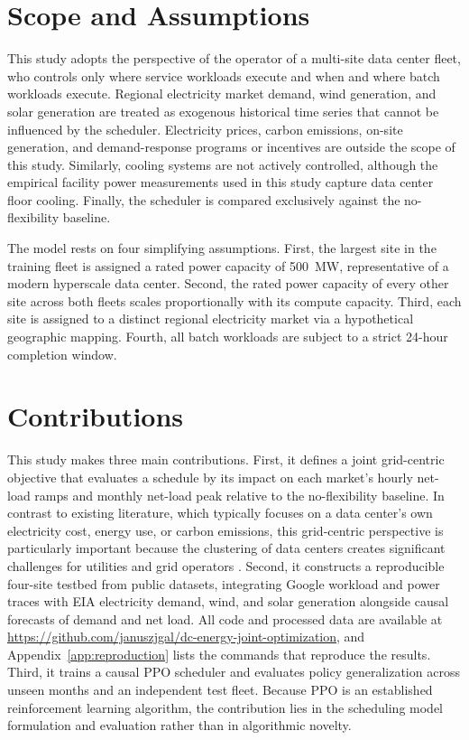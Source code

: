 \documentclass{UNCC-thesis}
\begin{document}
\section{Scope and Assumptions}
\label{sec:intro-scope}

This study adopts the perspective of the operator of a multi-site data center fleet, who controls
only where service workloads execute and when and where batch workloads execute. Regional
electricity market demand, wind generation, and solar generation are treated as exogenous
historical time series that cannot be influenced by the scheduler. Electricity prices, carbon
emissions, on-site generation, and demand-response programs or incentives are outside the scope of
this study. Similarly, cooling systems are not actively controlled, although the empirical
facility power measurements used in this study capture data center floor cooling. Finally, the
scheduler is compared exclusively against the no-flexibility baseline.

The model rests on four simplifying assumptions. First, the largest site in the training fleet is
assigned a rated power capacity of 500~MW, representative of a modern hyperscale data center.
Second, the rated power capacity of every other site across both fleets scales proportionally with
its compute capacity. Third, each site is assigned to a distinct regional electricity market via a
hypothetical geographic mapping. Fourth, all batch workloads are subject to a strict 24-hour
completion window.

\section{Contributions}
\label{sec:intro-contributions}

This study makes three main contributions. First, it defines a joint grid-centric objective that
evaluates a schedule by its impact on each market's hourly net-load ramps and monthly net-load
peak relative to the no-flexibility baseline. In contrast to existing literature, which typically
focuses on a data center's own electricity cost, energy use, or carbon emissions, this
grid-centric perspective is particularly important because the clustering of data centers creates
significant challenges for utilities and grid operators \cite{iea2026energyai}. Second, it
constructs a reproducible four-site testbed from public datasets, integrating Google workload and
power traces with EIA electricity demand, wind, and solar generation alongside causal forecasts of
demand and net load. All code and processed data are available at
\mbox{\url{https://github.com/januszjgal/dc-energy-joint-optimization}}, and
Appendix~\ref{app:reproduction} lists the commands that reproduce the results. Third, it trains a
causal PPO scheduler and evaluates policy generalization across unseen months and an independent
test fleet. Because PPO is an established reinforcement learning algorithm, the contribution lies
in the scheduling model formulation and evaluation rather than in algorithmic novelty.
\end{document}
